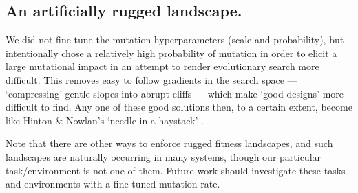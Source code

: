 

\subsection{An artificially rugged landscape.}

We did not fine-tune the mutation hyperparameters (scale and probability), but intentionally chose a relatively high probability of mutation in order to elicit a large mutational impact in an attempt to render evolutionary search more difficult. 
This removes easy to follow gradients in the search space --- `compressing' gentle slopes into abrupt cliffs --- which make `good designs' more difficult to find.  Any one of these good solutions then, to a certain extent, become like Hinton \& Nowlan's `needle in a haystack' \cite{hinton1987learning}.

Note that there are other ways to enforce rugged fitness landscapes, and such landscapes are naturally occurring in many systems, though our particular task/environment is not one of them. Future work should investigate these tasks and environments with a fine-tuned mutation rate. 

